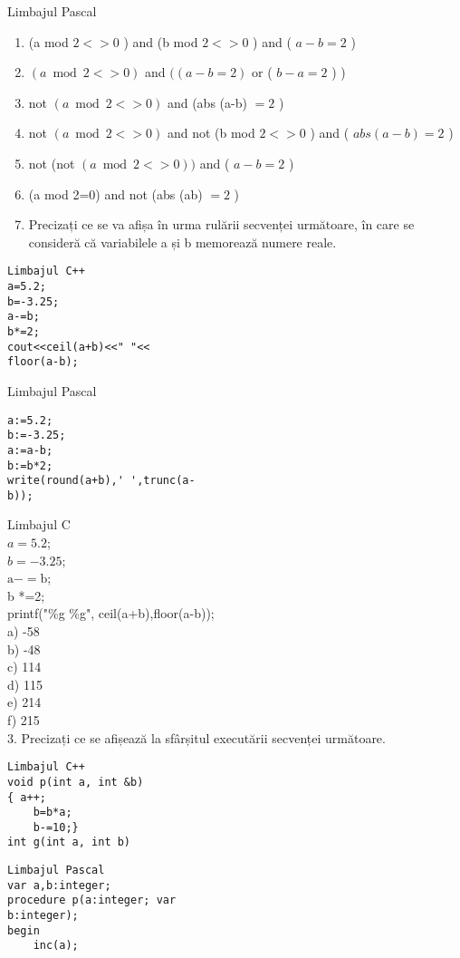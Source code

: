Limbajul Pascal

\begin{enumerate}
  \item (a mod $2<>0$ ) and (b mod $2<>0$ ) and ( $a-b=2$ )
  \item $(a \bmod 2<>0)$ and $((a-b=2)$ or ( $b-a=2$ ) )
  \item not $(a \bmod 2<>0)$ and (abs (a-b) $=2$ )
  \item not $(a \bmod 2<>0)$ and not (b mod $2<>0$ ) and ( $a b s(a-b)=2$ )
  \item not (not $(a \bmod 2<>0))$ and ( $a-b=2$ )
  \item (a mod 2=0) and not (abs (ab) $=2$ )
  \item Precizați ce se va afișa în urma rulării secvenței următoare, în care se consideră că variabilele a și b memorează numere reale.
\end{enumerate}

\begin{verbatim}
Limbajul C++
a=5.2;
b=-3.25;
a-=b;
b*=2;
cout<<ceil(a+b)<<" "<<
floor(a-b);
\end{verbatim}

Limbajul Pascal

\begin{verbatim}
a:=5.2;
b:=-3.25;
a:=a-b;
b:=b*2;
write(round(a+b),' ',trunc(a-
b));
\end{verbatim}

Limbajul C\\
$a=5.2$;\\
$b=-3.25$;\\
$\mathrm{a}-=\mathrm{b}$;\\
b *=2;\\
printf("\%g \%g", ceil(a+b),floor(a-b));\\
a) -58\\
b) -48\\
c) 114\\
d) 115\\
e) 214\\
f) 215\\
3. Precizați ce se afișează la sfârșitul executării secvenței următoare.

\begin{verbatim}
Limbajul C++
void p(int a, int &b)
{ a++;
    b=b*a;
    b-=10;}
int g(int a, int b)
\end{verbatim}

\begin{verbatim}
Limbajul Pascal
var a,b:integer;
procedure p(a:integer; var
b:integer);
begin
    inc(a);
\end{verbatim}

